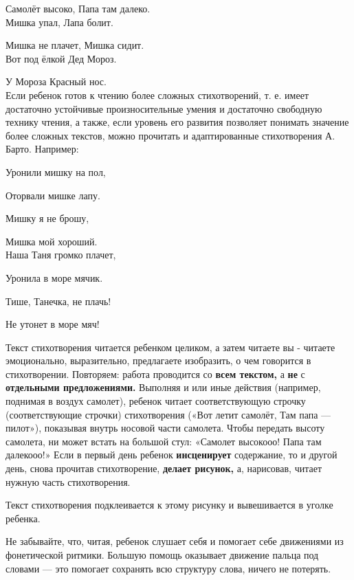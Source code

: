 \documentclass[a5paper]{book}
\begin{document}
Самолёт высоко, Папа там далеко.\\

Мишка упал, Лапа болит.

Мишка не плачет, Мишка сидит.\\

Вот под ёлкой Дед Мороз.

У Мороза Красный нос.\\



Если ребенок готов к чтению более сложных стихотворений, т. е. имеет
достаточно устойчивые произносительные умения и достаточно свободную
технику чтения, а также, если уровень его развития позволяет понимать
значение более сложных текстов, можно прочитать и адаптированные
стихотворения А. Барто. Например:



Уронили мишку на пол,

Оторвали мишке лапу.

Мишку я не брошу,

Мишка мой хороший.\\




Наша Таня громко плачет,

Уронила в море мячик.

Тише, Танечка, не плачь!

Не утонет в море мяч!





Текст стихотворения читается ребенком целиком, а затем читаете вы -
читаете эмоционально, выразительно, предлагаете изобразить, о чем
говорится в стихотворении. Повторяем: работа проводится со \textbf{всем
текстом,} а \textbf{не} с \textbf{отдельными предложениями.} Выполняя и
или иные действия (например, поднимая в воздух самолет), ребенок читает
соответствующую строчку (соответствующие строчки) стихотворения («Вот
летит самолёт, Там папа --- пилот»), показывая внутрь носовой части
самолета. Чтобы передать высоту самолета, ни может встать на большой
стул: «Самолет высокооо! Папа там далекооо!» Если в первый день ребенок
\textbf{инсценирует} содержание, то и другой день, снова прочитав
стихотворение, \textbf{делает рисунок,} а, нарисовав, читает нужную
часть стихотворения.

Текст стихотворения подклеивается к этому рисунку и вывешивается в
уголке ребенка.

Не забывайте, что, читая, ребенок слушает себя и помогает себе
движениями из фонетической ритмики. Большую помощь оказывает движение
пальца под словами --- это помогает сохранять всю структуру слова,
ничего не потерять.
\end{document}
